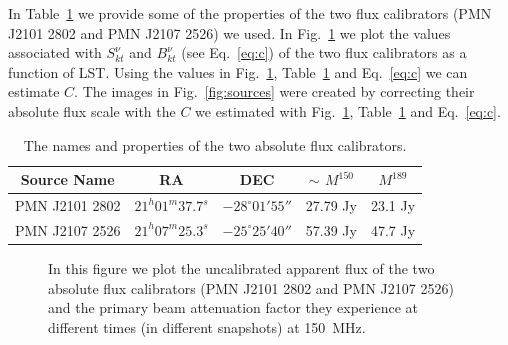 \documentclass[a4paper,10pt]{article}
\begin{document}
In Table~\ref{tab:sources} we provide some of the properties of the two flux calibrators (PMN J2101 2802 and PMN J2107 2526) we used.
In Fig.~\ref{fig:curves} we plot the values associated with $S_{kt}^{\nu}$ and $B_{kt}^{\nu}$ (see Eq.~\eqref{eq:c}) of the two flux calibrators as a function of LST.
Using the values in Fig.~\ref{fig:curves}, Table~\ref{tab:sources} and Eq.~\eqref{eq:c} we can estimate $C$. The images in Fig.~\ref{fig:sources} 
were created by correcting their absolute flux scale with the $C$ we estimated with Fig.~\ref{fig:curves}, Table~\ref{tab:sources} and Eq.~\eqref{eq:c}. 

\begin{table}
\caption{The names and properties of the two absolute flux calibrators.\label{tab:sources}}
\begin{center}
  \begin{tabular}{ | c | c | c | c | c |}
    \hline
    Source Name & RA & DEC & $\sim$ $M^{150}$ & $M^{189}$\\ \hline\hline
    PMN J2101 2802 & $21^h01^m37.7^s$ & $-28^{\circ}01'55''$ & 27.79 Jy & 23.1 Jy\\ 
    PMN J2107 2526 & $21^h07^m25.3^s$ & $-25^{\circ}25'40''$ & 57.39 Jy & 47.7 Jy\\
    \hline
  \end{tabular}
\end{center}
\end{table}


\begin{figure}
\centering
{}
\caption{In this figure we plot the uncalibrated apparent flux of the two absolute flux calibrators (PMN J2101 2802 and PMN J2107 2526) and the primary beam attenuation factor they experience 
at different times (in different snapshots) at 150~MHz. \label{fig:curves}} 
\end{figure}
\end{document}
